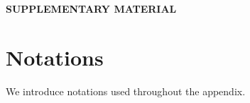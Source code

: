 \documentclass[
  12pt]{article}
\begin{document}






\newpage
{}
\appendix
\bigskip
\begin{center}
{\large\bf SUPPLEMENTARY MATERIAL}
\end{center}


\section{Notations}

We introduce notations used throughout the appendix. 
\end{document}
